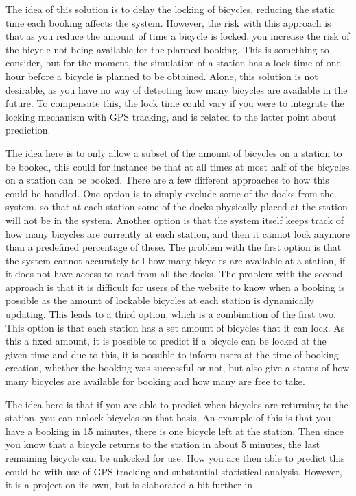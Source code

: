 \begin{description}[style=nextline]
		\item[Lock late]
		The idea of this solution is to delay the locking of bicycles, reducing the static time each booking affects the system.
		However, the risk with this approach is that as you reduce the amount of time a bicycle is locked, you increase the risk of the bicycle not being available for the planned booking.
		This is something to consider, but for the moment, the simulation of a station has a lock time of one hour before a bicycle is planned to be obtained.
		Alone, this solution is not desirable, as you have no way of detecting how many bicycles are available in the future.
		To compensate this, the lock time could vary if you were to integrate the locking mechanism with GPS tracking, and is related to the latter point about prediction.
		
		\item[Subset of bicycles for booking]
		The idea here is to only allow a subset of the amount of bicycles on a station to be booked, this could for instance be that at all times at most half of the bicycles on a station can be booked.
		There are a few different approaches to how this could be handled.
		One option is to simply exclude some of the docks from the system, so that at each station some of the docks physically placed at the station will not be in the system.
		Another option is that the system itself keeps track of how many bicycles are currently at each station, and then it cannot lock anymore than a predefined percentage of these.
		The problem with the first option is that the system cannot accurately tell how many bicycles are available at a station, if it does not have access to read from all the docks.
		The problem with the second approach is that it is difficult for users of the website to know when a booking is possible as the amount of lockable bicycles at each station is dynamically updating.
		This leads to a third option, which is a combination of the first two.
		This option is that each station has a set amount of bicycles that it can lock.
		As this a fixed amount, it is possible to predict if a bicycle can be locked at the given time and due to this, it is possible to inform users at the time of booking creation, whether the booking was successful or not, but also give a status of how many bicycles are available for booking and how many are free to take.
		
		\item[Prediction]
		The idea here is that if you are able to predict when bicycles are returning to the station, you can unlock bicycles on that basis.
		An example of this is that you have a booking in 15 minutes, there is one bicycle left at the station. Then since you know that a bicycle returns to the station in about 5 minutes, the last remaining bicycle can be unlocked for use.
		How you are then able to predict this could be with use of GPS tracking and substantial statistical analysis.
		However, it is a project on its own, but is elaborated a bit further in .
\end{description}

